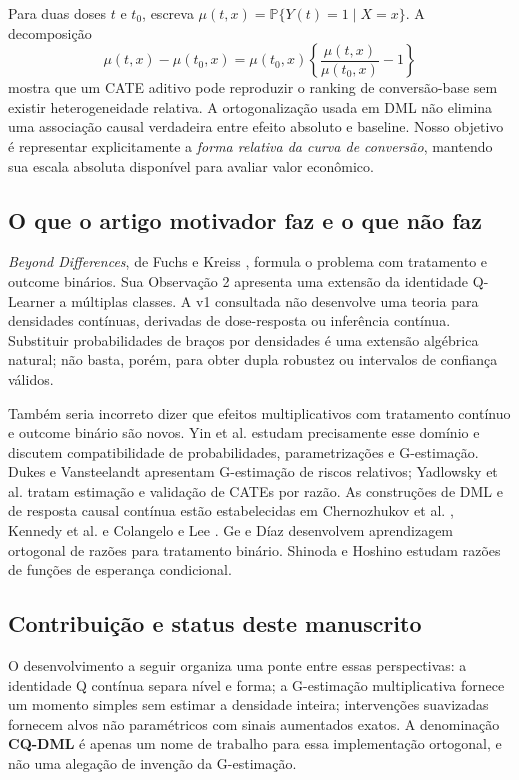 \documentclass[11pt,a4paper]{article}
\newcommand{\Pp}{\mathbb P}
\begin{document}
Para duas doses $t$ e $t_0$, escreva $\mu(t,x)=\Pp\{Y(t)=1\mid X=x\}$. A decomposição
\begin{equation}
\mu(t,x)-\mu(t_0,x)
=\mu(t_0,x)\left\{\frac{\mu(t,x)}{\mu(t_0,x)}-1\right\}
\label{eq:decomp}
\end{equation}
mostra que um CATE aditivo pode reproduzir o ranking de conversão-base sem existir heterogeneidade relativa. A ortogonalização usada em DML não elimina uma associação causal verdadeira entre efeito absoluto e baseline. Nosso objetivo é representar explicitamente a \emph{forma relativa da curva de conversão}, mantendo sua escala absoluta disponível para avaliar valor econômico.

\subsection{O que o artigo motivador faz e o que não faz}
\emph{Beyond Differences}, de Fuchs e Kreiss \cite{fuchs2026}, formula o problema com tratamento e outcome binários. Sua Observação 2 apresenta uma extensão da identidade Q-Learner a múltiplas classes. A v1 consultada não desenvolve uma teoria para densidades contínuas, derivadas de dose-resposta ou inferência contínua. Substituir probabilidades de braços por densidades é uma extensão algébrica natural; não basta, porém, para obter dupla robustez ou intervalos de confiança válidos.

Também seria incorreto dizer que efeitos multiplicativos com tratamento contínuo e outcome binário são novos. Yin et al. \cite{yin2022} estudam precisamente esse domínio e discutem compatibilidade de probabilidades, parametrizações e G-estimação. Dukes e Vansteelandt \cite{dukes2018} apresentam G-estimação de riscos relativos; Yadlowsky et al. \cite{yadlowsky2021} tratam estimação e validação de CATEs por razão. As construções de DML e de resposta causal contínua estão estabelecidas em Chernozhukov et al. \cite{chernozhukov2018}, Kennedy et al. \cite{kennedy2017} e Colangelo e Lee \cite{colangelo2020}. Ge e Díaz \cite{ge2026} desenvolvem aprendizagem ortogonal de razões para tratamento binário. Shinoda e Hoshino \cite{shinoda2022} estudam razões de funções de esperança condicional.

\subsection{Contribuição e status deste manuscrito}
O desenvolvimento a seguir organiza uma ponte entre essas perspectivas: a identidade Q contínua separa nível e forma; a G-estimação multiplicativa fornece um momento simples sem estimar a densidade inteira; intervenções suavizadas fornecem alvos não paramétricos com sinais aumentados exatos. A denominação \textbf{CQ-DML} é apenas um nome de trabalho para essa implementação ortogonal, e não uma alegação de invenção da G-estimação.
\end{document}
